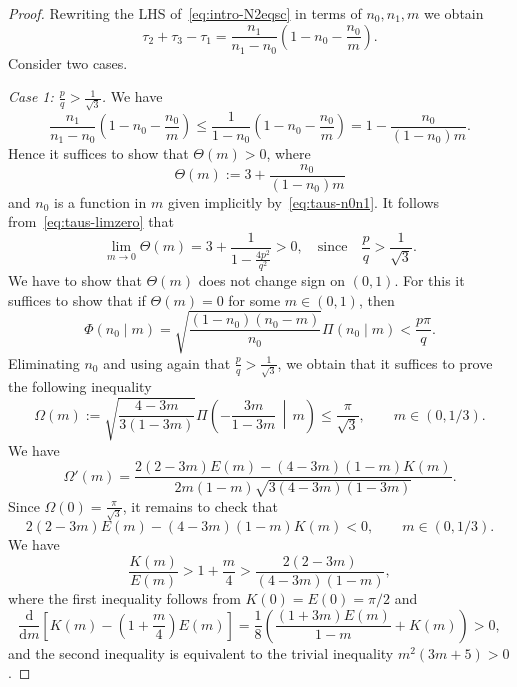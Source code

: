 \documentclass{amsart}
\let\le\leqslant
\renewcommand{\d}{\mathrm{d}}
\newcommand{\bigmid}{\,\middle\vert\,}
\theoremstyle{plain}
\theoremstyle{definition}
\theoremstyle{remark}
\begin{document}
\begin{proof}
Rewriting the LHS of~\eqref{eq:intro-N2eqsc} in terms of \(n_0,n_1,m\) we obtain
\[
\tau_2+\tau_3-\tau_1=\frac{n_1}{n_1-n_0}\left(1-n_0-\frac{n_0}m\right).
\]
Consider two cases.

\textit{Case 1: \(\frac{p}q>\frac{1}{\sqrt 3}\).} We have
\[
\frac{n_1}{n_1-n_0}\left(1-n_0-\frac{n_0}m\right)\le
\frac{1}{1-n_0}\left(1-n_0-\frac{n_0}m\right)=
1-\frac{n_0}{(1-n_0)m}.
\]
Hence it suffices to show that \(\Theta(m)>0\), where
\[
\Theta(m):=3+\frac{n_0}{(1-n_0)m}
\]
and \(n_0\) is a function in \(m\) given implicitly by~\eqref{eq:taus-n0n1}. It
follows from~\eqref{eq:taus-limzero} that
\[
\lim_{m\to 0}\Theta(m)=3+\frac{1}{1-\frac{4p^2}{q^2}}>0,\quad\text{since}\quad
\frac{p}q>\frac{1}{\sqrt 3}.
\]
We have to show that \(\Theta(m)\) does not change sign on \((0,1)\). For this
it suffices to show that if \(\Theta(m)=0\) for some \(m\in (0,1)\), then
\[
\Phi(n_0\mid m)=\sqrt{\frac{(1-n_0)(n_0-m)}{n_0}}\Pi(n_0\mid m)<\frac{p\pi}q.
\]
Eliminating \(n_0\) and using again that \(\frac{p}q>\frac{1}{\sqrt 3}\), we
obtain that it suffices to prove the following inequality
\[
\Omega(m):=\sqrt{\frac{4-3m}{3(1-3m)}}\Pi\left(-\frac{3m}{1-3m}\bigmid
m\right)\le\frac{\pi}{\sqrt 3},\qquad m\in (0,1/3).
\]
We have
\[
\Omega'(m)=\frac{2(2-3m)E(m)-(4-3m)(1-m)K(m)}{2m(1-m)\sqrt{3(4-3m)(1-3m)}}.
\]
Since \(\Omega(0)=\frac{\pi}{\sqrt 3}\), it remains to check that
\[
2(2-3m)E(m)-(4-3m)(1-m)K(m)<0,\qquad m\in (0,1/3).
\]
We have
\[
\frac{K(m)}{E(m)}>1+\frac{m}4>\frac{2(2-3m)}{(4-3m)(1-m)},
\]
where the first inequality follows from \(K(0)=E(0)=\pi/2\) and
\[
\frac{\d}{\d m}\left[K(m)-\left(1+\frac{m}4\right)E(m)\right]=
\frac{1}8\left(\frac{(1+3m)E(m)}{1-m}+K(m)\right)>0,
\]
and the second inequality is equivalent to the trivial inequality
\(m^2(3m+5)>0\).


\end{proof}
\end{document}
